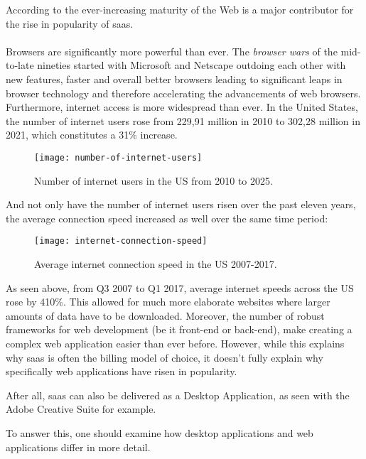 According to \textcite{jacobs2005} the ever-increasing maturity of the Web is a major contributor for the rise in popularity of
\acrshort{saas}.\paragraph{}
Browsers are significantly more powerful than ever. 
The \emph{browser wars} of the mid-to-late nineties started with Microsoft and Netscape outdoing each other with
new features, faster and overall better browsers leading to significant leaps in browser technology and therefore 
accelerating the advancements of web browsers. \parencite{mozilla2021,jensen2017} \pagebreak
Furthermore, internet access is more widespread than ever.
In the United States, the number of internet users rose from 229,91 million in 2010 to 302,28 million in 2021,
which constitutes a 31\% increase.\par
\begin{figure}[H]
    \centering
    \texttt{[image: number-of-internet-users]}
    \caption{Number of internet users in the US from 2010 to 2025. \parencite{statista2021}}
    \label{fig:num-of-internet-users}
\end{figure}
And not only have the number of internet users risen over the past eleven years, the average connection speed increased as well
over the same time period:
\begin{figure}[H]
    \centering
    \texttt{[image: internet-connection-speed]}
    \caption{Average internet connection speed in the US 2007-2017. \parencite{akamai2017}}
    \label{fig:internet-speed}
\end{figure}
As seen above, from Q3 2007 to Q1 2017, average internet speeds across the US rose by 410\%.
This allowed for much more elaborate websites where larger amounts of data have to be downloaded.
Moreover, the number of robust frameworks for web development (be it front-end or back-end), make creating a complex web application easier
than ever before.
However, while this explains why \acrshort{saas} is often the billing model of choice, it doesn't fully explain why specifically web applications
have risen in popularity. \parencite{statista2021}\par
After all, \acrshort{saas} can also be delivered as a Desktop Application, as seen with the Adobe Creative Suite for example. \parencite{adobe2021}\par
To answer this, one should examine how desktop applications and web applications differ in more detail.

